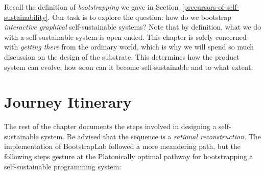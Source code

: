 \documentclass[ twoside,openright,titlepage,numbers=noenddot,headinclude,footinclude,cleardoublepage=empty,abstract=on,
                BCOR=5mm,paper=a4,fontsize=11pt
                ]{scrreprt}
\newcommand{\joel}[1]{}
\theoremstyle{definition}
\begin{document}
\joel{
This is necessarily the case for any interesting interactive programming system, regardless of its programming paradigm. Even in functional, declarative, reactive or logic paradigms, the evaluation or re-computation in response to interaction with a user produces a new (changed) state.

When discussing state, we refer to both the visible interface and the hidden internal state of the programming system. The state always consists of substructures such as byte arrays, object graphs or trees. Correspondingly, a change to the state can be decomposed into sub-changes that affect small parts of the state.^[It may be argued that a very high-level programming paradigm would make it impossible to affect only small parts of the state. This may, however, not be a suitable starting point for a self-sustainable system.] This gives rise to primitive *instructions* that describe state change at the finest level of granularity.
}

Recall the definition of \emph{bootstrapping} we gave in
Section~\ref{precursors-of-self-sustainability}. Our task is to explore
the question: how do we bootstrap \emph{interactive graphical}
self-sustainable systems? Note that by definition, what we do with a
self-sustainable system is open-ended. This chapter is solely concerned
with \emph{getting there} from the ordinary world, which is why we will
spend so much discussion on the design of the substrate. This determines
how the product system can evolve, how soon can it become
self-sustainable and to what extent.

\hypertarget{journey-itinerary}{\section{Journey Itinerary}\label{journey-itinerary}}

The rest of the chapter documents the steps involved in designing a
self-sustainable system. Be advised that the sequence is a
\emph{rational reconstruction.} The implementation of BootstrapLab
followed a more meandering path, but the following steps gesture at the
Platonically optimal pathway for bootstrapping a self-sustainable
programming system:
\end{document}
